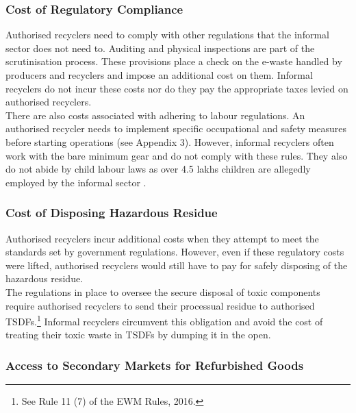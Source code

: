 \documentclass[a4paper, 12pt]{article}
\begin{document}
                    \subsubsection{Cost of Regulatory Compliance}
                    
                    Authorised recyclers need to comply with other regulations that the informal sector does not need to. Auditing and physical inspections are part of the scrutinisation process. These provisions place a check on the e-waste handled by producers and recyclers and impose an additional cost on them. Informal recyclers do not incur these costs nor do they pay the appropriate taxes levied on authorised recyclers. \\
                    
                    There are also costs associated with adhering to labour regulations. An authorised recycler needs to implement specific occupational and safety measures before starting operations (see Appendix 3). However, informal recyclers often work with the bare minimum gear and do not comply with these rules. They also do not abide by child labour laws as over 4.5 lakhs children are allegedly employed by the informal sector \parencite{assochamchild}.
                    
                    \subsubsection{Cost of Disposing Hazardous Residue }
                    
                    Authorised recyclers incur additional costs when they attempt to meet the standards set by government regulations. However, even if these regulatory costs were lifted, authorised recyclers would still have to pay for safely disposing of the hazardous residue.\\
                     
                     The regulations in place to oversee the secure disposal of toxic components require authorised recyclers to send their processual residue to authorised TSDFs.\footnote{See Rule 11 (7) of the EWM Rules, 2016.} Informal recyclers circumvent this obligation and avoid the cost of treating their toxic waste in TSDFs by dumping it in the open.
                    
                    \subsubsection{Access to Secondary Markets for Refurbished Goods}
                    
\end{document}
